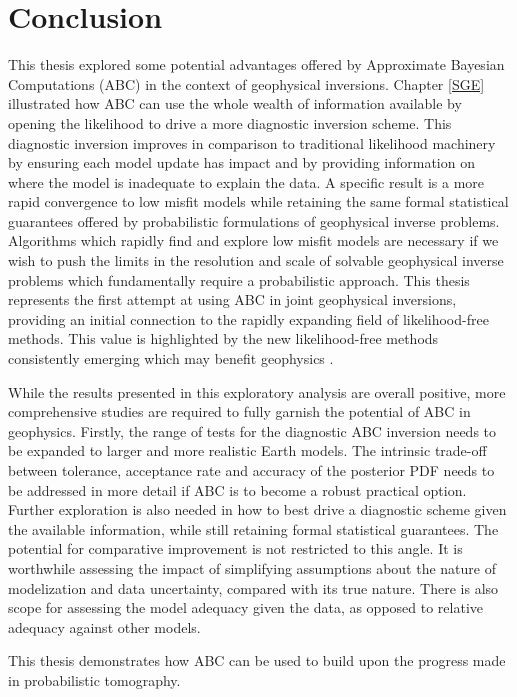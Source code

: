 

\chapter{Conclusion}

This thesis explored some potential advantages offered by Approximate Bayesian Computations (ABC) in the context of geophysical inversions. Chapter \ref{SGE} illustrated how ABC can use the whole wealth  of information available by opening the likelihood to drive a more diagnostic inversion scheme. This diagnostic inversion improves in comparison to traditional likelihood machinery by ensuring each model update has impact and by providing information on where the model is inadequate to explain the data. A specific result is a more rapid convergence to low misfit models while retaining the same formal statistical guarantees offered by probabilistic formulations of geophysical inverse problems. Algorithms which rapidly find and explore low misfit models are necessary if we wish to push the limits in the resolution and scale of solvable geophysical inverse problems which fundamentally require a probabilistic approach. This thesis represents the first attempt at using ABC in joint geophysical inversions, providing an initial connection to the rapidly expanding field of likelihood-free methods. This value is highlighted by the new likelihood-free methods consistently emerging which may benefit geophysics \citep{papamakarios2016fast,song2017nice}.\par

While the results presented in this exploratory analysis are overall positive, more comprehensive studies are required to fully garnish the potential of ABC in geophysics. Firstly, the range of tests for the diagnostic ABC inversion needs to be expanded to larger and more realistic Earth models. The intrinsic trade-off between tolerance, acceptance rate and accuracy of the posterior PDF needs to be addressed in more detail if ABC is to become a robust practical option. Further exploration is also needed in how to best drive a diagnostic scheme given the available information, while still retaining formal statistical guarantees. The potential for comparative improvement is not restricted to this angle. It is worthwhile assessing the impact of simplifying assumptions about the nature of modelization and data uncertainty, compared with its true nature. There is also scope for assessing the model adequacy given the data, as opposed to relative adequacy against other models. \par

This thesis demonstrates how ABC can be used to build upon the progress made in probabilistic tomography.
